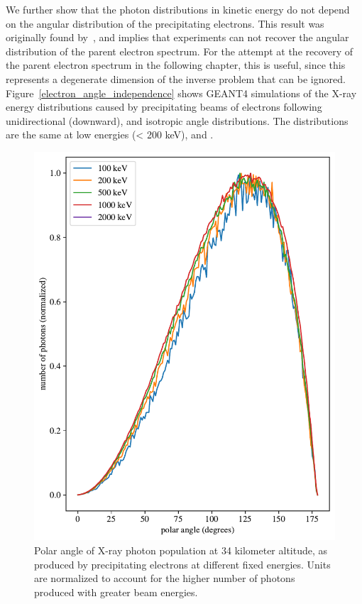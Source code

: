 We further show that the photon distributions in kinetic energy do not depend on the angular distribution of the precipitating electrons. This result was originally found by~\citet{Rees1963}, and implies that experiments can not recover the angular distribution of the parent electron spectrum. For the attempt at the recovery of the parent electron spectrum in the following chapter, this is useful, since this represents a degenerate dimension of the inverse problem that can be ignored. Figure~\ref{electron_angle_independence} shows GEANT4 simulations of the X-ray energy distributions caused by precipitating beams of electrons following unidirectional (downward), and isotropic angle distributions. The distributions are the same at low energies (< 200 keV), and .

\begin{figure}[p]
\label{photon_angle_independence}
\includegraphics[width=\textwidth]{figures/chapter_3/photon_angle_independence/photon_angle_independence}
\caption{Polar angle of X-ray photon population at 34 kilometer altitude, as produced by precipitating electrons at different fixed energies. Units are normalized to account for the higher number of photons produced with greater beam energies.}
\end{figure}


